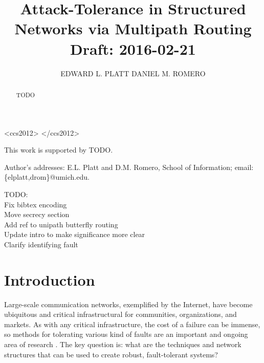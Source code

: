 \documentclass[prodmode,permissions]{acmsmall-ec16}
\begin{document}

\title{
Attack-Tolerance in Structured Networks via Multipath Routing
\\ Draft: 2016-02-21
}
\author{EDWARD L. PLATT
DANIEL M. ROMERO
}

\begin{abstract}
TODO
\end{abstract}


\begin{CCSXML}
<ccs2012>
</ccs2012>  
\end{CCSXML}




\begin{bottomstuff}
This work is supported by TODO.

Author's addresses: E.L. Platt and D.M. Romero, School of Information; email: \{elplatt,drom\}@umich.edu.
\end{bottomstuff}

\maketitle

TODO:\\
Fix bibtex encoding\\
Move secrecy section\\
Add ref to unipath butterfly routing\\
Update intro to make significance more clear\\
Clarify identifying fault\\

\section{Introduction}

Large-scale communication networks, exemplified by the Internet,
have become ubiquitous and critical infrastructural for
communities, organizations, and markets.
As with any critical infrastructure, the cost of a failure can be
immense, so methods for tolerating various kind of faults are an
important and ongoing area of research
\cite{zin_survey_2015,albert_error_2000,sterbenz_resilience_2010}.
The key question is: what are the techniques and network structures that can
be used to create robust, fault-tolerant systems?
\end{document}
